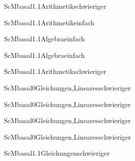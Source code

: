 \documentclass[12pt]{article}
\begin{document}
\begin{Add}{ScM}{basal1.1}{Arithmetik}{schwieriger}
\end{Add}

\begin{Add}{ScM}{basal1.1}{Arithmetik}{einfach}
\end{Add}

\begin{Add}{ScM}{basal1.1}{Algebra}{einfach}
\end{Add}

\begin{Add}{ScM}{basal1.1}{Algebra}{einfach}
\end{Add}

\begin{Add}{ScM}{basal1.1}{Arithmetik}{schwieriger}
\end{Add}

\begin{Add}{ScM}{basal0}{Gleichungen,Lineares}{schwieriger}
\end{Add}

\begin{Add}{ScM}{basal0}{Gleichungen,Lineares}{schwieriger}
\end{Add}

\begin{Add}{ScM}{basal0}{Gleichungen,Lineares}{schwieriger}
\end{Add}

\begin{Add}{ScM}{basal0}{Gleichungen,Lineares}{schwieriger}
\end{Add}

\begin{Add}{ScM}{basal1.1}{Gleichungen}{schwieriger}
\end{Add}
\end{document}
